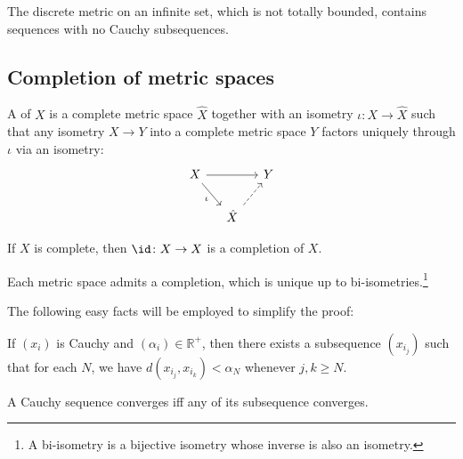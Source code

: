 	\begin{rmk}
		The discrete metric on an infinite set, which is not totally bounded, contains sequences with no Cauchy subsequences.
	\end{rmk}



\subsection{Completion of metric spaces}

	A  of $X$ is a complete metric space $\hat X$ together with an isometry $\iota\colon X\to \hat X$ such that any isometry $X\to Y$ into a complete metric space $Y$ factors uniquely through $\iota$ via an isometry:
	\[
	\begin{tikzcd}[column sep=small]
		X\ar[rr]\ar[dr, "\iota"'] & & Y\\
		& \hat X\ar[ur, dashed] & 
	\end{tikzcd}
	\]
	
	\begin{cor}
		If $X$ is complete, then $\id\colon X\to X$ is a completion of $X$.
	\end{cor}
	
	\begin{thm}\label{THM: completion of metric spaces}
		Each metric space admits a completion, which is unique up to bi-isometries.\footnote{
			A bi-isometry is a bijective isometry whose inverse is also an isometry.
		}
	\end{thm}
	
	\noindent The following easy facts will be employed to simplify the proof:
	
	\begin{lem}\label{LEM: some properties of Cauchy sequences}
		\leavevmode
		\begin{mylist}
			\item If $(x_i)$ is Cauchy and $(\alpha_i)\in\mathbb R^+$, then there exists a subsequence $(x_{i_j})$ such that for each $N$, we have $d(x_{i_j}, x_{i_k}) < \alpha_N$ whenever $j, k\ge N$.
			
			\item A Cauchy sequence converges iff any of its subsequence converges.
		\end{mylist}
	\end{lem}
	
